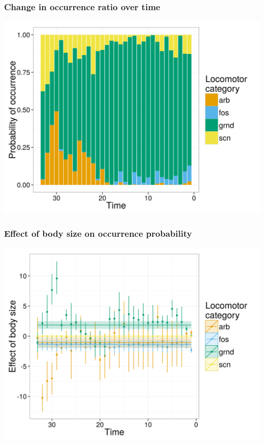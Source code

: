 \documentclass{beamer}
\begin{document}
\begin{frame}
  \frametitle{Change in occurrence ratio over time}
  \begin{center}
    \includegraphics[width=\textwidth,height=0.8\textheight,keepaspectratio=true]{figure/occurrence_prob}
  \end{center}
\end{frame}

\begin{frame}
  \frametitle{Effect of body size on occurrence probability}
  \begin{center}
    \includegraphics[width=\textwidth,height=0.8\textheight,keepaspectratio=true]{figure/trait_eff}
  \end{center}
\end{frame}
\end{document}
